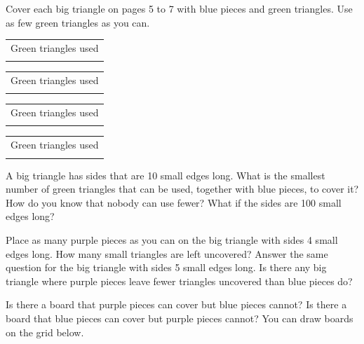\documentclass{article}
\makeatletter
\newcommand{\usedbox}{\begin{tabular}{@{}c@{}}Green triangles used\\[2pt]\ansbox\end{tabular}}
\makeatother
\begin{document}
\newpage
Cover each big triangle on pages 5 to 7 with blue pieces and green triangles.
Use as few green triangles as you can.

\vspace{0.15in}
\begin{center}
\hspace{0.5in}\usedbox

\vspace{0.4in}
\hspace{0.5in}\usedbox
\end{center}

\newpage
\vspace*{0.3in}
\begin{center}

\vspace{0.3in}
\usedbox
\end{center}

\newpage
\vspace*{0.2in}
\begin{center}

\vspace{0.3in}
\usedbox
\end{center}

\newpage
A big triangle has sides that are 10 small edges long.
What is the smallest number of green triangles that can be used, together with blue pieces, to cover it?
How do you know that nobody can use fewer?
What if the sides are 100 small edges long?

\vspace{0.1in}
Place as many purple pieces as you can on the big triangle with sides 4 small edges long.
How many small triangles are left uncovered?
Answer the same question for the big triangle with sides 5 small edges long.
Is there any big triangle where purple pieces leave fewer triangles uncovered than blue pieces do?

\vspace{0.1in}
Is there a board that purple pieces can cover but blue pieces cannot?
Is there a board that blue pieces can cover but purple pieces cannot?
You can draw boards on the grid below.

\vspace{0.1in}
\begin{center}
\end{center}
\end{document}
